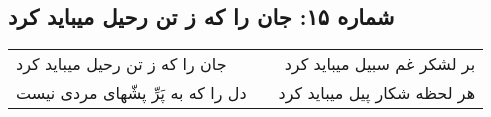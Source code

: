 \begin{center}
\section*{شماره ۱۵: جان را که ز تن رحیل میباید کرد}
\label{sec:015}
\begin{longtable}{l p{0.5cm} r}
جان را که ز تن رحیل میباید کرد
&&
بر لشکر غم سبیل میباید کرد
\\
دل را که به پَرِّ پشّهای مردی نیست
&&
هر لحظه شکار پیل میباید کرد
\\
\end{longtable}
\end{center}
